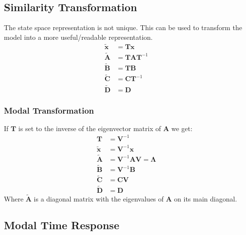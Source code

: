 \subsection{Similarity Transformation}
The state space representation is not unique. This can be used to transform the model into a more \flqq{}useful/readable\frqq{} representation.
\begin{align*}
    \tilde{\mathbf{x}} & = \mathbf{Tx}       \\
    \tilde{\mathbf{A}} & = \mathbf{TAT}^{-1} \\
    \tilde{\mathbf{B}} & = \mathbf{TB}       \\
    \tilde{\mathbf{C}} & = \mathbf{CT}^{-1}  \\
    \tilde{\mathbf{D}} & = \mathbf{D}
\end{align*}
\subsubsection{Modal Transformation}
If $\mathbf{T}$ is set to the inverse of the eigenvector matrix of $\mathbf{A}$ we get:
\begin{align*}
    \mathbf{T}         & = \mathbf{V}^{-1}                           \\
    \tilde{\mathbf{x}} & = \mathbf{V}^{-1}\mathbf{x}                 \\
    \tilde{\mathbf{A}} & = \mathbf{V}^{-1}\mathbf{AV} = \bm{\Lambda} \\
    \tilde{\mathbf{B}} & = \mathbf{V}^{-1}\mathbf{B}                 \\
    \tilde{\mathbf{C}} & = \mathbf{CV}                               \\
    \tilde{\mathbf{D}} & = \mathbf{D}
\end{align*}
Where $\tilde{\mathbf{A}}$ is a diagonal matrix with the eigenvalues of $\mathbf{A}$ on its main diagonal.

\subsection{Modal Time Response}
